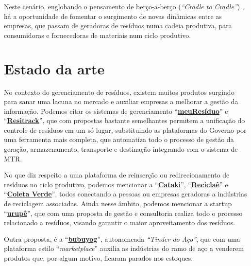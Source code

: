 Neste cenário, englobando o pensamento de berço-a-berço (\textit{“Cradle to Cradle”}) \cite{braungart_cradle_2009}, há a oportunidade de fomentar o surgimento de novas dinâmicas entre as empresas, que passam de geradoras de resíduos numa cadeia produtiva, para consumidoras e fornecedoras de materiais num ciclo produtivo. 


\section{Estado da arte}

No contexto do gerenciamento de resíduos, existem muitos produtos surgindo para sanar uma lacuna no mercado e auxiliar empresas a melhorar a gestão da informação. Podemos citar os sistemas de gerenciamento “\href{https://www.meuresiduo.com/}{\textbf{meuResíduo}}” e “\href{https://www.resitrack.com.br/}{\textbf{Resitrack}}”, que com propostas bastante semelhantes permitem a unificação do controle de resíduos em um só lugar, substituindo as plataformas do Governo por uma ferramenta mais completa, que automatiza todo o processo de gestão da geração, armazenamento, transporte e destinação integrando com o sistema de \gls{MTR}.

No que diz respeito a uma plataforma de reinserção ou redirecionamento de resíduos no ciclo produtivo, podemos mencionar a “\href{https://www.cataki.org/}{\textbf{Cataki}}”, “\href{https://www.instagram.com/reciclae/}{\textbf{Reciclaê}}” e “\href{https://www1.sfiec.org.br/fiec-noticias/search/134129/sindiverde-lanca-app-que-conecta-produtores-de-residuos-a-industrias-de-reciclagem}{\textbf{Coleta Verde}}”, todos conectando a pessoas ou empresas geradoras a indústrias de reciclagem associadas. Ainda nesse âmbito, podemos mencionar a startup “\href{https://www.urupe.eco.br/}{\textbf{urupê}}”, que com uma proposta de gestão e consultoria realiza todo o processo relacionado a resíduos, visando garantir o maior aproveitamento dos resíduos.

Outra proposta, é a “\href{https://www.bubuyog.com.br/}{\textbf{bubuyog}}”, autonomeada \textit{“Tinder do Aço”}, que com uma plataforma estilo “\textit{marketplace}” auxilia as indústrias do ramo de aço a venderem produtos que, por algum motivo, ficaram parados nos estoques.